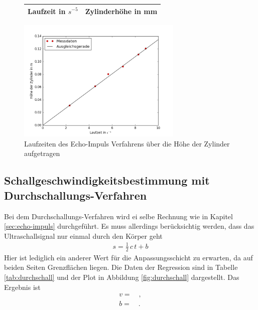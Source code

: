  \begin{figure}[h!]
 	\centering
 	\begin{tabular}{c|c}
 		Laufzeit in $s^{-5}$ & Zylinderhöhe in mm\\
 		\hline
 		
 	\end{tabular}
 	\label{tab:echo-impuls}
 \end{figure}
 
 \begin{figure}[h!]
 	\centering
 	\includegraphics[width=0.7\textwidth]{build/Impuls-Echo.png}
 	\caption{Laufzeiten des Echo-Impuls Verfahrens über die Höhe der Zylinder aufgetragen}
 	\label{fig:regression1}
 \end{figure}
 

 
 
 
 \clearpage
 \subsection{Schallgeschwindigkeitsbestimmung mit Durchschallungs-Verfahren}
 Bei dem Durchschallungs-Verfahren wird ei selbe Rechnung wie in Kapitel \ref{sec:echo-impuls} durchgeführt. Es muss allerdings berücksichtig werden, dass das Ultraschallsignal nur einmal durch den Körper geht
 \begin{align}
 	s = \frac{1}{2} \, c \, t + b
 \end{align}
 Hier ist lediglich ein anderer Wert für die Anpassungsschicht zu erwarten, da auf beiden Seiten Grenzflächen liegen. Die Daten der Regression sind in Tabelle \ref{tab:durchschall} und der Plot in Abbildung \ref{fig:durchschall} dargestellt. Das Ergebnis ist
  \begin{align}
  	v =  \quad ,\\
  	b =  \quad .
  \end{align}
  
